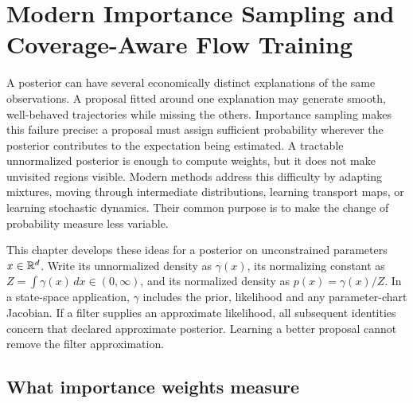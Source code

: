 \chapter[Modern Importance Sampling]{Modern Importance Sampling and Coverage-Aware Flow Training}
\label{ch:bf-modern-is}

A posterior can have several economically distinct explanations of the same
observations. A proposal fitted around one explanation may generate smooth,
well-behaved trajectories while missing the others. Importance sampling makes
this failure precise: a proposal must assign sufficient probability wherever
the posterior contributes to the expectation being estimated. A tractable
unnormalized posterior is enough to compute weights, but it does not make
unvisited regions visible. Modern methods address this difficulty by adapting
mixtures, moving through intermediate distributions, learning transport maps,
or learning stochastic dynamics. Their common purpose is to make the change
of probability measure less variable.

This chapter develops these ideas for a posterior on unconstrained parameters
$x\in\mathbb{R}^d$. Write its unnormalized density as $\gamma(x)$, its normalizing
constant as $Z=\int\gamma(x)\,dx\in(0,\infty)$, and its normalized density as
$p(x)=\gamma(x)/Z$. In a state-space application, $\gamma$ includes the prior,
likelihood and any parameter-chart Jacobian. If a filter supplies an approximate
likelihood, all subsequent identities concern that declared approximate
posterior. Learning a better proposal cannot remove the filter approximation.

\section{What importance weights measure}
\label{sec:bf-is-foundations}

